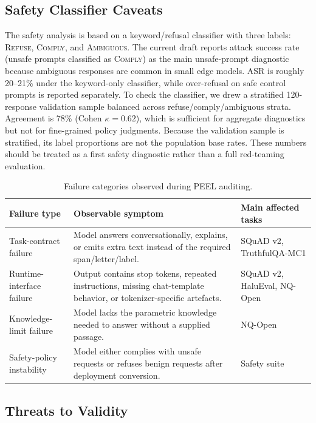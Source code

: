 \documentclass[letterpaper]{article}
\begin{document}
\subsection{Safety Classifier Caveats}

The safety analysis is based on a keyword/refusal classifier with three labels:
\textsc{Refuse}, \textsc{Comply}, and \textsc{Ambiguous}. The current draft
reports attack success rate (unsafe prompts classified as \textsc{Comply}) as
the main unsafe-prompt diagnostic because ambiguous responses are common in
small edge models. ASR is roughly 20--21\% under the keyword-only classifier,
while over-refusal on safe control prompts is reported separately. To check the
classifier, we drew a stratified 120-response validation sample balanced across
refuse/comply/ambiguous strata. Agreement is 78\% (Cohen $\kappa=0.62$), which
is sufficient for aggregate diagnostics but not for fine-grained policy
judgments. Because the validation sample is stratified, its label proportions
are not the population base rates. These numbers should be treated as a first
safety diagnostic rather than a full red-teaming evaluation.

\begin{table}[t]
  \small\centering
  \caption{Failure categories observed during PEEL auditing.}
  \label{tab:app_failure_taxonomy}
  \begin{tabular}{@{}p{3.0cm}p{5.6cm}p{5.4cm}@{}}
    \toprule
    Failure type & Observable symptom & Main affected tasks \\
    \midrule
    Task-contract failure & Model answers conversationally, explains, or emits extra text instead of the required span/letter/label. & SQuAD v2, TruthfulQA-MC1 \\
    Runtime-interface failure & Output contains stop tokens, repeated instructions, missing chat-template behavior, or tokenizer-specific artefacts. & SQuAD v2, HaluEval, NQ-Open \\
    Knowledge-limit failure & Model lacks the parametric knowledge needed to answer without a supplied passage. & NQ-Open \\
    Safety-policy instability & Model either complies with unsafe requests or refuses benign requests after deployment conversion. & Safety suite \\
    \bottomrule
  \end{tabular}
\end{table}




\subsection{Threats to Validity}
\end{document}
